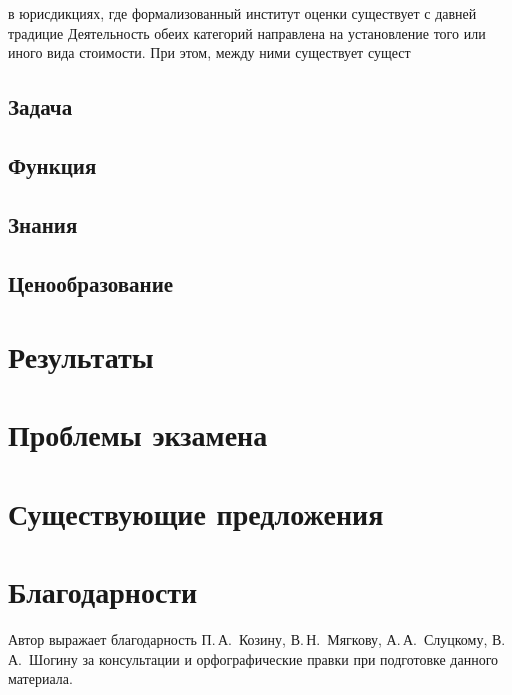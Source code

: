 \documentclass[12pt]{scrartcl}
\begin{document}
в юрисдикциях, где формализованный институт оценки существует   с давней традицие Деятельность обеих категорий направлена на установление того или иного вида стоимости. При этом, между ними существует сущест
\subsection{Задача}

\subsection{Функция}

\subsection{Знания}

\subsection{Ценообразование}

\section{Результаты}\label{sec:results}

\section{Проблемы экзамена}

\section{Существующие предложения}

\section{Благодарности}\label{sec:acknowledgements}
Автор выражает благодарность П.\,А.~Козину, В.\,Н.~Мягкову, А.\,А.~Слуцкому, В.\,А.~Шогину за консультации и орфографические правки при подготовке данного материала.





\printbibliography
\end{document}
